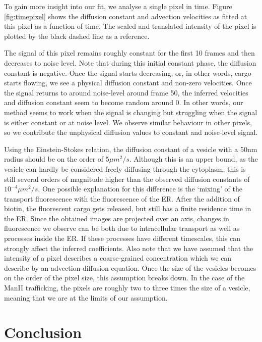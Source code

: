 \documentclass{Dissertate}
\begin{document}
To gain more insight into
our fit, we analyse a single pixel in time. Figure
\ref{fig:timepixel} shows the diffusion constant and advection velocities as fitted at this pixel as a function of time. The scaled and translated intensity of the pixel is plotted by the black dashed line as a reference.

The signal of this pixel remains roughly constant for the first 10 frames and then decreases to noise level. Note that during this initial constant phase, the diffusion constant is negative. Once the signal starts
decreasing, or, in other words, cargo starts flowing, we
see a physical diffusion constant and non-zero velocities. Once the
signal returns to around noise-level around frame 50, the inferred
velocities and diffusion constant seem to become random around 0. In
other words, our method seems to work when the signal is changing but
struggling when the signal is either constant or at noise level. We
observe similar behaviour in other pixels, so we contribute the unphysical diffusion values to constant and noise-level signal.

Using the Einstein-Stokes relation, the diffusion constant of a vesicle with a 50nm radius should be on the order of 5$\mu m^2/s$. Although this is an upper bound, as the vesicle can hardly be considered freely diffusing through the cytoplasm, this is still several orders of magnitude higher than the observed diffusion constants of $10^{-4}\mu m^2/s$. One possible explanation for this difference is the `mixing' of the transport fluorescence with the fluorescence of the
ER. After the addition of biotin, the fluorescent cargo gets released,
but still has a finite residence time in the ER. Since the obtained
images are projected over an axis, changes in fluorescence we observe
can be both due to intracellular transport as well as processes inside
the ER. If these processes have different timescales, this can strongly
affect the inferred coefficients. 
Also note that we have assumed that the intensity of a pixel describes a coarse-grained concentration which we can describe by an advection-diffusion equation. Once the size of the vesicles becomes on the order of the pixel size, this assumption breaks down. In the case of the ManII trafficking, the pixels are roughly two to three times the size of a vesicle, meaning that we are at the limits of our assumption. 

\hypertarget{conclusion}{%
\section{Conclusion}\label{conclusion}}
\end{document}
